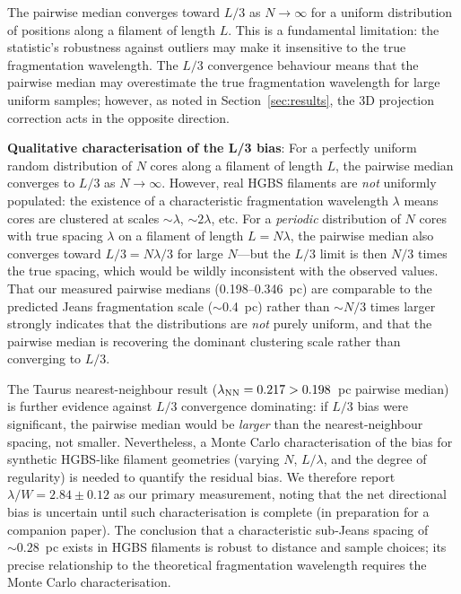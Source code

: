 \documentclass[twoside,twocolumn]{mnras}
\begin{document}
The pairwise median converges toward $L/3$ as $N \to \infty$ for a uniform distribution
of positions along a filament of length $L$. This is a fundamental limitation: the
statistic's robustness against outliers may make it insensitive to the true fragmentation
wavelength. The $L/3$ convergence behaviour means that the pairwise median may overestimate the true
fragmentation wavelength for large uniform samples; however, as noted in
Section~\ref{sec:results}, the 3D projection correction acts in the opposite direction.

\textbf{Qualitative characterisation of the L/3 bias}: For a perfectly uniform random
distribution of $N$ cores along a filament of length $L$, the pairwise median converges
to $L/3$ as $N \to \infty$. However, real HGBS filaments are \textit{not} uniformly
populated: the existence of a characteristic fragmentation wavelength $\lambda$ means
cores are clustered at scales $\sim\lambda$, $\sim 2\lambda$, etc. For a \textit{periodic}
distribution of $N$ cores with true spacing $\lambda$ on a filament of length $L = N\lambda$,
the pairwise median also converges toward $L/3 = N\lambda/3$ for large $N$---but the
$L/3$ limit is then $N/3$ times the true spacing, which would be wildly inconsistent
with the observed values. That our measured pairwise medians (0.198--0.346~pc) are
comparable to the predicted Jeans fragmentation scale ($\sim$0.4~pc) rather than
$\sim N/3$ times larger strongly indicates that the distributions are \textit{not}
purely uniform, and that the pairwise median is recovering the dominant clustering scale
rather than converging to $L/3$.

The Taurus nearest-neighbour result ($\lambda_{\rm NN} = 0.217 > 0.198$~pc pairwise
median) is further evidence against $L/3$ convergence dominating: if $L/3$ bias were
significant, the pairwise median would be \textit{larger} than the nearest-neighbour
spacing, not smaller. Nevertheless, a Monte Carlo characterisation of the bias for
synthetic HGBS-like filament geometries (varying $N$, $L/\lambda$, and the degree of
regularity) is needed to quantify the residual bias. We therefore report $\lambda/W = 2.84
\pm 0.12$ as our primary measurement, noting that the net directional bias is uncertain
until such characterisation is complete (in preparation for a companion paper). The
conclusion that a characteristic sub-Jeans spacing of $\sim 0.28$~pc exists in HGBS
filaments is robust to distance and sample choices; its precise relationship to the
theoretical fragmentation wavelength requires the Monte Carlo characterisation.
\end{document}

